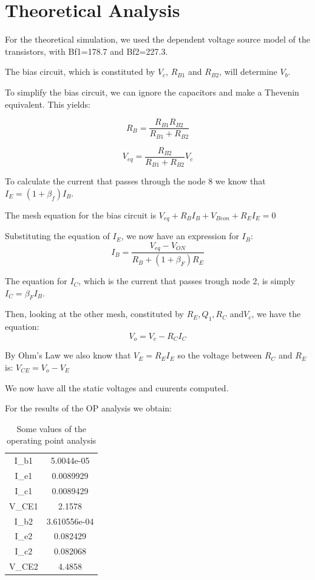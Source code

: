 \section{Theoretical Analysis}
\label{sec:analysis}

For the theoretical simulation, we used the dependent voltage source model of the transistors, with Bf1=178.7 and Bf2=227.3.

The bias circuit, which is constituted by $V_c$, $R_{B1}$ and $R_{B2}$, will determine $V_b$.

To simplify the bias circuit, we can ignore the capacitors and make a Thevenin equivalent. This yields:

\begin{equation}
	R_B=\frac{R_{B1} R_{B2}}{R_{B1}+R_{B2}}
\end{equation}

\begin{equation}
	V_{eq}= \frac{R_{B2}}{R_{B1}+R_{B2}} V_{c}
\end{equation}

To calculate the current that passes through the node 8 we know that $I_E= (1+\beta_f)I_B$.

The mesh equation for the bias circuit is $V_{eq} + R_BI_B + V_{Beon} + R_EI_E =0$

Substituting the equation of $I_E$, we now have an expression for $I_B$:
\begin{equation}
	I_{B}= \frac{V_{eq}-V_{ON}}{R_{B}+(1+\beta_F)R_{E}}
\end{equation}

The equation for $I_C$, which is the current that passes trough node 2, is simply $I_C = \beta_F I_B$.

Then, looking at the other mesh, constituted by $R_E, Q_1, R_C$ and$ V_c$, we have the equation:
\begin{equation}
	V_{o}= V_c-R_{C}I_{C}
\end{equation}

By Ohm's Law we also know that $V_E= R_EI_E$ so the voltage between $R_C$ and $R_E$ is: $V_{CE} = V_o - V_E$


We now have all the static voltages and cuurents computed.

For the results of the OP analysis we obtain:

\begin{table}[H]
    \addtolength{\tabcolsep}{-4pt}
    \caption{Some values of the operating point analysis}
    \vspace{-3mm}
    \begin{tabular}{|c|c|}
    \hline
    I_{b1} &  5.0044e-05\\
    I_{e1} &  0.0089929\\
    I_{c1} &  0.0089429  \\ 
    V_{CE1} &  2.1578\\
    I_{b2} &  3.610556e-04 \\
    I_{e2} &  0.082429\\
    I_{c2} &  0.082068\\
    V_{CE2} & 4.4858\\
    \hline
    \end{tabular}
    \label{tab:OP_mat}
\end{table}

